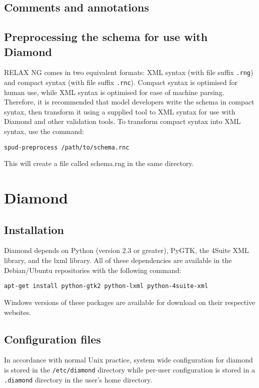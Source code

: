 \documentclass[a4paper, 11pt]{book}
\begin{document}
\section{Comments and annotations}

\section{Preprocessing the schema for use with Diamond}
RELAX NG comes in two equivalent formats: XML syntax (with
file suffix \verb+.rng+) and compact
syntax (with file suffix \verb+.rnc+).
Compact syntax is optimised for human use, while XML
syntax is optimised for ease of machine parsing. Therefore, 
it is recommended that model developers write the schema
in compact syntax, then transform it using a supplied tool
to XML syntax for use with Diamond and other validation tools.
To transform compact syntax into XML syntax, use the command:
\begin{verbatim}
spud-preprocess /path/to/schema.rnc
\end{verbatim}
This will create a file called schema.rng in the same directory.

\chapter{Diamond}

\section{Installation}
Diamond depends on Python (version 2.3 or greater), PyGTK,
the 4Suite XML library, and the lxml library. All of these dependencies
are available in the Debian/Ubuntu repositories with the following command:
\begin{verbatim}
apt-get install python-gtk2 python-lxml python-4suite-xml
\end{verbatim}

Windows versions of these packages are available for download on their respective websites.

\section{Configuration files}

In accordance with normal Unix practice, system wide configuration for
diamond is stored in the \verb+/etc/diamond+ directory while per-user
configuration is stored in a \verb+.diamond+ directory in the user's home
directory.
\end{document}
